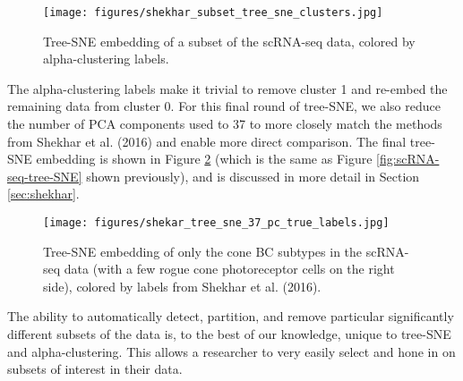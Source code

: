 \documentclass{article}
\begin{document}
\begin{figure}[htp]
    \centering
    \captionsetup{width=.9\linewidth}
    \texttt{[image: figures/shekhar\_subset\_tree\_sne\_clusters.jpg]}
    \caption{Tree-SNE embedding of a subset of the scRNA-seq data, colored by alpha-clustering labels.}
    \label{fig:RNA-subset-clusters-tree-SNE}
\end{figure}

The alpha-clustering labels make it trivial to remove cluster 1 and re-embed the remaining data from cluster 0. For this final round of tree-SNE, we also reduce the number of PCA components used to 37 to more closely match the methods from Shekhar et al. (2016) and enable more direct comparison. The final tree-SNE embedding is shown in Figure \ref{fig:RNA-subsubset-tree-SNE} (which is the same as Figure \ref{fig:scRNA-seq-tree-SNE} shown previously), and is discussed in more detail in Section \ref{sec:shekhar}.

\begin{figure}[H]
    \centering
    \captionsetup{width=.9\linewidth}
    \texttt{[image: figures/shekar\_tree\_sne\_37\_pc\_true\_labels.jpg]}
    \caption{Tree-SNE embedding of only the cone BC subtypes in the scRNA-seq data (with a few rogue cone photoreceptor cells on the right side), colored by labels from Shekhar et al. (2016).}
    \label{fig:RNA-subsubset-tree-SNE}
\end{figure}

The ability to automatically detect, partition, and remove particular significantly different subsets of the data is, to the best of our knowledge, unique to tree-SNE and alpha-clustering. This allows a researcher to very easily select and hone in on subsets of interest in their data.

  
\end{document}
